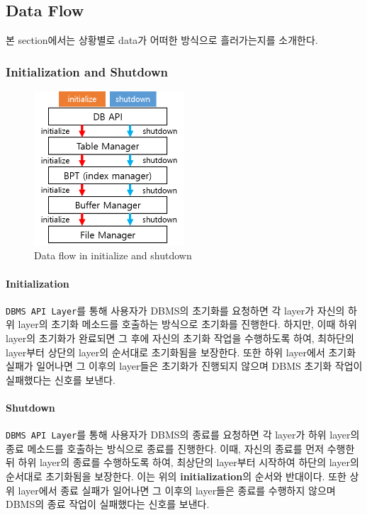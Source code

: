 \documentclass[main.tex]{subfiles}
\begin{document}
\subsection{Data Flow}
본 section에서는 상황별로 data가 어떠한 방식으로 흘러가는지를 소개한다.

\subsubsection{Initialization and Shutdown}
\begin{figure}[h]
	\centering
	\includegraphics[width=0.5\textwidth]{images/dataflow/initialize_shutdown.png}
	\caption{Data flow in initialize and shutdown}
\end{figure}

\paragraph{Initialization} 
\texttt{DBMS API Layer}를 통해 사용자가 DBMS의 초기화를 요청하면 각 layer가 자신의 하위 layer의 초기화 메소드를 호출하는 방식으로 초기화를 진행한다.
하지만, 이때 하위 layer의 초기화가 완료되면 그 후에 자신의 초기화 작업을 수행하도록 하여, 최하단의 layer부터 상단의 layer의 순서대로 초기화됨을 보장한다.
또한 하위 layer에서 초기화 실패가 일어나면 그 이후의 layer들은 초기화가 진행되지 않으며 DBMS 초기화 작업이 실패했다는 신호를 보낸다.

\paragraph{Shutdown}
\texttt{DBMS API Layer}를 통해 사용자가 DBMS의 종료를 요청하면 각 layer가 하위 layer의 종료 메소드를 호출하는 방식으로 종료를 진행한다.
이때, 자신의 종료를 먼저 수행한 뒤 하위 layer의 종료를 수행하도록 하여, 최상단의 layer부터 시작하여 하단의 layer의 순서대로 초기화됨을 보장한다. 이는 위의 \textbf{initialization}의 순서와 반대이다.
또한 상위 layer에서 종료 실패가 일어나면 그 이후의 layer들은 종료를 수행하지 않으며 DBMS의 종료 작업이 실패했다는 신호를 보낸다.
\end{document}
